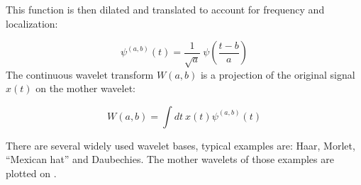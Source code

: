 This function is then dilated and translated to account for frequency and localization:

\begin{equation}
	\psi^{(a,b)}(t) = \frac{1}{\sqrt{a}} \: \psi\left(\frac{t-b}{a}\right)
\end{equation}
The continuous wavelet transform $W(a,b)$ is a projection of the original signal $x(t)$ on the mother wavelet:

\begin{equation}
	W(a,b) = \int \! dt \: x(t) \psi^{(a,b)}(t)
\end{equation}

There are several widely used wavelet bases, typical examples are: Haar, Morlet, ``Mexican hat'' and Daubechies.
The mother wavelets of those examples are plotted on .

